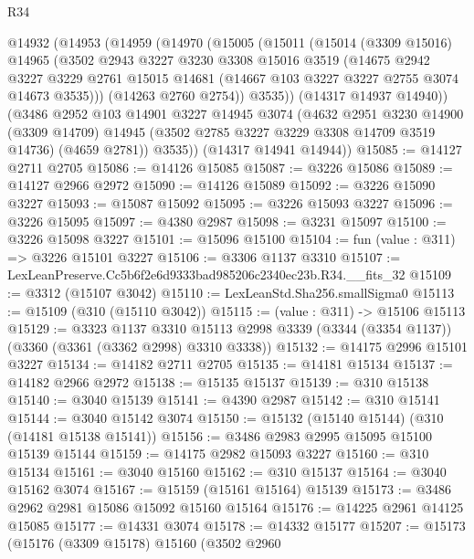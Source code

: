 \begin{lexlean}{R34}
\begin{coremodule}
  @14932
    (@14953
      (@14959
        (@14970
          (@15005
            (@15011
              (@15014
                (@3309 @15016)
                @14965
                (@3502
                  @2943
                  @3227
                  @3230
                  @3308
                  @15016
                  @3519
                  (@14675
                    @2942
                    @3227
                    @3229
                    @2761
                    @15015
                    @14681
                    (@14667 @103 @3227 @3227 @2755 @3074 @14673 @3535)))
                (@14263 @2760 @2754))
              @3535))
          (@14317 @14937 @14940))
        (@3486
          @2952
          @103
          @14901
          @3227
          @14945
          @3074
          (@4632
            @2951
            @3230
            @14900
            (@3309 @14709)
            @14945
            (@3502 @2785 @3227 @3229 @3308 @14709 @3519 @14736)
            (@4659 @2781))
          @3535))
      (@14317 @14941 @14944))
@15085 := @14127 @2711 @2705
@15086 := @14126 @15085
@15087 := @3226 @15086
@15089 := @14127 @2966 @2972
@15090 := @14126 @15089
@15092 := @3226 @15090 @3227
@15093 := @15087 @15092
@15095 := @3226 @15093 @3227
@15096 := @3226 @15095
@15097 := @4380 @2987
@15098 := @3231 @15097
@15100 := @3226 @15098 @3227
@15101 := @15096 @15100
@15104 := fun (value : @311) => @3226 @15101 @3227
@15106 := @3306 @1137 @3310
@15107 := LexLeanPreserve.Cc5b6f2e6d9333bad985206c2340ec23b.R34.__fits_32
@15109 := @3312 (@15107 @3042)
@15110 := LexLeanStd.Sha256.smallSigma0
@15113 := @15109 (@310 (@15110 @3042))
@15115 := (value : @311) -> @15106 @15113
@15129 := @3323
    @1137
    @3310
    @15113
    @2998
    @3339
    (@3344 (@3354 @1137))
    (@3360 (@3361 (@3362 @2998) @3310 @3338))
@15132 := @14175 @2996 @15101 @3227
@15134 := @14182 @2711 @2705
@15135 := @14181 @15134
@15137 := @14182 @2966 @2972
@15138 := @15135 @15137
@15139 := @310 @15138
@15140 := @3040 @15139
@15141 := @4390 @2987
@15142 := @310 @15141
@15144 := @3040 @15142 @3074
@15150 := @15132 (@15140 @15144) (@310 (@14181 @15138 @15141))
@15156 := @3486 @2983 @2995 @15095 @15100 @15139 @15144
@15159 := @14175 @2982 @15093 @3227
@15160 := @310 @15134
@15161 := @3040 @15160
@15162 := @310 @15137
@15164 := @3040 @15162 @3074
@15167 := @15159 (@15161 @15164) @15139
@15173 := @3486 @2962 @2981 @15086 @15092 @15160 @15164
@15176 := @14225 @2961 @14125 @15085
@15177 := @14331 @3074
@15178 := @14332 @15177
@15207 := @15173
    (@15176
      (@3309 @15178)
      @15160
      (@3502
        @2960

\end{coremodule}
\end{lexlean}

